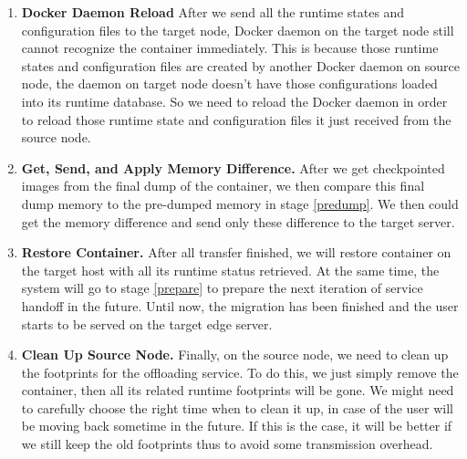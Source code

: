 \begin{enumerate}[label=\textbf{S\arabic*}]
\item \label{daemon-Reload} \textbf{Docker Daemon Reload} After we send all the runtime states and configuration files to the target node, Docker daemon on the target node still cannot recognize the container immediately.  This is because those runtime states and configuration files are created by another Docker daemon on source node, the daemon on target node doesn't have those configurations loaded into its runtime database. So we need to reload the Docker daemon in order to reload those runtime state and configuration files it just received from the source node.

\item \label{img-sync} \textbf{Get, Send, and Apply Memory Difference.} After we get checkpointed images from the final dump of the container, we then compare this final dump memory to the pre-dumped memory in stage \ref{predump}. We then could get the memory difference and send only these difference to the target server. 

\item \label{restore} \textbf{Restore Container.} After all transfer finished, we will restore container on the target host with all its runtime status retrieved. At the same time, the system will go to stage \ref{prepare} to prepare the next iteration of service handoff in the future. Until now, the migration has been finished and the user starts to be served on the target edge server.

\item \label{clean} \textbf{Clean Up Source Node.} Finally, on the source node, we need to clean up the footprints for the offloading service. To do this, we just simply remove the container, then all its related runtime footprints will be gone. We might need to carefully choose the right time when to clean it up, in case of the user will be moving back sometime in the future. If this is the case, it will be better if we still keep the old footprints thus to avoid some transmission overhead. 


\end{enumerate}



% 
% 

